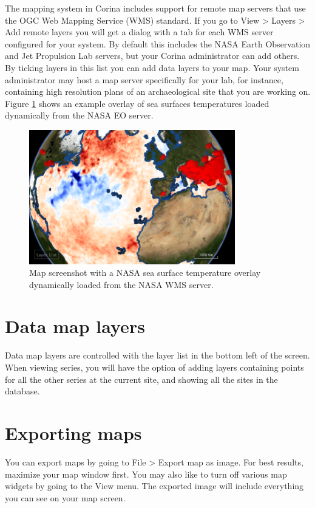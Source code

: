 The mapping system in Corina includes support for remote map servers that use the OGC Web Mapping Service (WMS) standard. If you go to View > Layers > Add remote layers you will get a dialog with a tab for each WMS server configured for your system. By default this includes the NASA Earth Observation and Jet Propulsion Lab servers, but your Corina administrator can add others. By ticking layers in this list you can add data layers to your map. Your system administrator may host a map server specifically for your lab, for instance, containing high resolution plans of an archaeological site that you are working on. Figure \ref{fig:wms} shows an example overlay of sea surfaces temperatures loaded dynamically from the NASA EO server.

\begin{figure}[hbtp]
  \caption{Map screenshot with a NASA sea surface temperature overlay dynamically loaded from the NASA WMS server.}
  \label{fig:wms}
  \centering
    \includegraphics[width=0.8\textwidth]{Images/sst.png}
\end{figure}

\section{Data map layers}
Data map layers are controlled with the layer list in the bottom left of the screen. When viewing series, you will have the option of adding layers containing points for all the other series at the current site, and showing all the sites in the database. 


\section{Exporting maps}

You can export maps by going to File > Export map as image. For best results, maximize your map window first. You may also like to turn off various map widgets by going to the View menu. The exported image will include everything you can see on your map screen. 